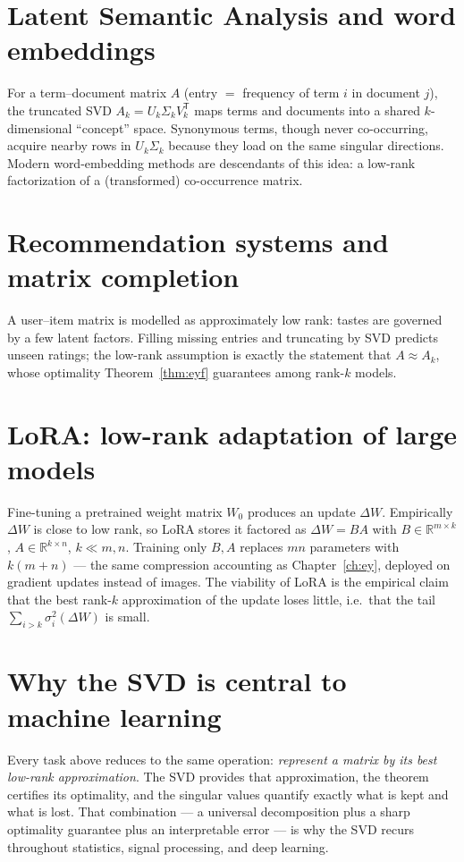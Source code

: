 \documentclass[11pt,oneside]{book}
\theoremstyle{plain}
\theoremstyle{definition}
\theoremstyle{remark}
\newcommand{\R}{\mathbb{R}}
\newcommand{\T}{^{\mathsf T}}
\begin{document}
\section{Latent Semantic Analysis and word embeddings}
For a term--document matrix $A$ (entry $=$ frequency of term $i$ in document $j$), the
truncated SVD $A_k=U_k\Sigma_kV_k\T$ maps terms and documents into a shared
$k$-dimensional ``concept'' space. Synonymous terms, though never co-occurring, acquire
nearby rows in $U_k\Sigma_k$ because they load on the same singular directions. Modern
word-embedding methods are descendants of this idea: a low-rank factorization of a
(transformed) co-occurrence matrix.

\section{Recommendation systems and matrix completion}
A user--item matrix is modelled as approximately low rank: tastes are governed by a few
latent factors. Filling missing entries and truncating by SVD predicts unseen ratings;
the low-rank assumption is exactly the statement that $A\approx A_k$, whose optimality
Theorem~\ref{thm:eyf} guarantees among rank-$k$ models.

\section{LoRA: low-rank adaptation of large models}
Fine-tuning a pretrained weight matrix $W_0$ produces an update $\Delta W$. Empirically
$\Delta W$ is close to low rank, so LoRA stores it factored as $\Delta W=BA$ with
$B\in\R^{m\times k}$, $A\in\R^{k\times n}$, $k\ll m,n$. Training only $B,A$ replaces $mn$
parameters with $k(m+n)$ --- the same compression accounting as
Chapter~\ref{ch:ey}, deployed on gradient updates instead of images. The viability of
LoRA is the empirical claim that the best rank-$k$ approximation of the update loses
little, i.e.\ that the tail $\sum_{i>k}\sigma_i^2(\Delta W)$ is small.

\section{Why the SVD is central to machine learning}
Every task above reduces to the same operation: \emph{represent a matrix by its best
low-rank approximation}. The SVD provides that approximation, the theorem certifies its
optimality, and the singular values quantify exactly what is kept and what is lost. That
combination --- a universal decomposition plus a sharp optimality guarantee plus an
interpretable error --- is why the SVD recurs throughout statistics, signal processing,
and deep learning.
\end{document}

